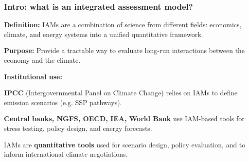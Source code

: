 \documentclass[xcolor=x11names,compress,aspectratio=169]{beamer}%
\makeatletter
\renewenvironment{itemize}{\begin{compactitemize}[<+-| alert@+>]}{\end{compactitemize}}
\makeatother
\begin{document}
%

\begin{frame}%
%

\frametitle{Intro: what is an integrated assessment model?}%


\begin{itemize}
\item \textbf{Definition:} IAMs are a combination of science from different
fields: economics, climate, and energy systems into a unified quantitative
framework. \vspace{0.3cm}

\item \textbf{Purpose:} Provide a tractable way to evaluate long-run
interactions between the economy and the climate. \vspace{0.3cm}

\item \textbf{Institutional use:}

\begin{itemize}
\item \textbf{IPCC} (Intergovernmental Panel on Climate Change) relies on IAMs
to define emission scenarios (e.g. SSP pathways).

\item \textbf{Central banks, NGFS, OECD, IEA, World Bank} use IAM-based tools
for stress testing, policy design, and energy forecasts.
\end{itemize}

\vspace{0.3cm}

\item IAMs are \textbf{quantitative tools} used for scenario design, policy
evaluation, and to inform international climate negotiations.
\end{itemize}

%

\transboxout
\end{frame}%
%
\end{document}

